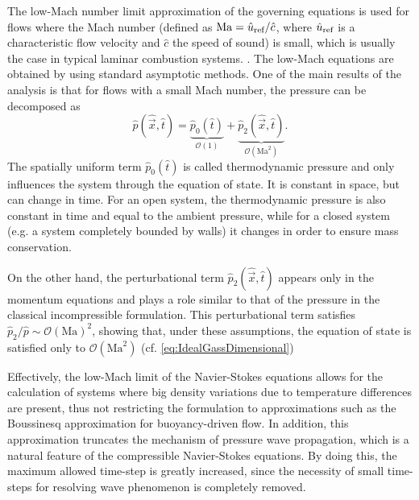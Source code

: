 The low-Mach number limit approximation of the governing equations is used for flows where the Mach number (defined as $\text{Ma} = \hat u_{\text{ref}}/\hat c$, where $\hat u_{\text{ref}}$ is a characteristic flow velocity and $\hat{c}$ the speed of sound) is small, which is usually the case in typical laminar combustion systems. \parencite{dobbinsFullyImplicitCompact2010}.
The low-Mach equations are obtained by using standard asymptotic methods. One of the main results of the analysis is that for flows with a small Mach number, the pressure can be decomposed as
\begin{equation}
	\hat p(\hat {\vec{x}}, \hat t) = \underbrace{\hat p_0(\hat t)}_{\mathcal{O}(1)} + \underbrace{\hat p_2(\hat{\vec{x}},\hat t)}_{\mathcal{O}(\text{Ma}^2)} .
\end{equation}
The spatially uniform term $\hat p_0(\hat t)$ is called thermodynamic pressure and only influences the system through the equation of state. It is constant in space, but can change in time.  For an open system, the thermodynamic pressure is also constant in time and equal to the ambient pressure, while for a closed system (e.g. a system completely bounded by walls) it changes in order to ensure mass conservation. 

On the other hand, the perturbational term $\hat p_2(\hat{\vec{x}},\hat t)$ appears only in the momentum equations and plays a role similar to that of the pressure in the classical incompressible formulation. This perturbational term satisfies $\hat p_2/\hat p \sim \mathcal{O}(\text{Ma})^2$, \parencite{dobbinsFullyImplicitCompact2010,nonakaConservativeThermodynamicallyConsistent2018} showing that, under these assumptions, the equation of state is satisfied only to $\mathcal{O}(\text{Ma}^2)$ (cf.  \cref{eq:IdealGassDimensional})

Effectively, the low-Mach limit of the Navier-Stokes equations allows for the calculation of systems where big density variations due to temperature differences are present, thus not restricting the formulation to approximations such as the Boussinesq approximation for buoyancy-driven flow. In addition, this approximation truncates the mechanism of pressure wave propagation, which is a natural feature of the compressible Navier-Stokes equations. By doing this, the maximum allowed time-step is greatly increased, since the necessity of small time-steps for resolving wave phenomenon is completely removed.


